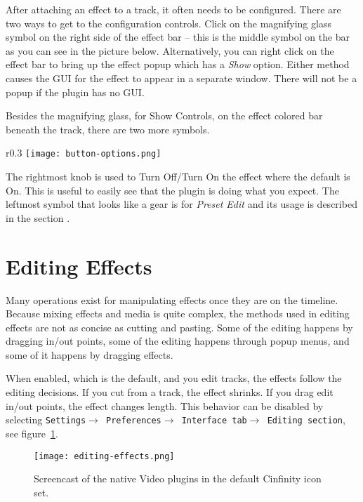 After attaching an effect to a track, it often needs to be configured. There are two ways to get to the configuration controls. Click on the magnifying glass symbol on the right side of the effect bar -- this is the middle symbol on the bar as you can see in the picture below. Alternatively, you can right click on the effect bar to bring up the effect popup which has a \textit{Show} option. Either method causes the GUI for the effect to appear in a separate window. There will not be a popup if the plugin has no GUI.


Besides the magnifying glass, for Show Controls, on the effect colored bar beneath the track, there are two more symbols.

\begin{wrapfigure}[2]{r}{0.3\linewidth}
    \vspace{-3ex}
    \centering
    \texttt{[image: button-options.png]}
\end{wrapfigure}

The rightmost knob is used to Turn Off/Turn On the effect where the default is On. This is useful to easily see that the plugin is doing what you expect. The leftmost symbol that looks like a gear is for \textit{Preset Edit} and its usage is described in the section .

\section{Editing Effects}%
\label{sec:editing_effects}

Many operations exist for manipulating effects once they are on the timeline. Because mixing effects and media is quite complex, the methods used in editing effects are not as concise as cutting and pasting. Some of the editing happens by dragging in/out points, some of the editing happens through popup menus, and some of it happens by dragging effects.

When enabled, which is the default, and you edit tracks, the effects follow the editing decisions. If you cut from a track, the effect shrinks. If you drag edit in/out points, the effect changes length. This behavior can be disabled by selecting \texttt{Settings$\rightarrow$ Preferences$\rightarrow$ Interface tab$\rightarrow$ Editing section}, see figure~\ref{fig:editing-effects}.

\begin{figure}[htpb]
    \centering
    \texttt{[image: editing-effects.png]}
    \caption{Screencast of the native Video plugins in the default Cinfinity icon set.}
    \label{fig:editing-effects}
\end{figure}

